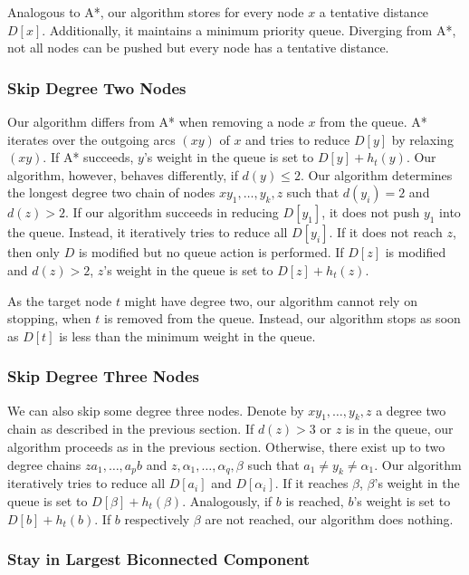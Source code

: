 \documentclass[manuscript,review]{acmart}
\begin{document}
Analogous to A*, our algorithm stores for every node $x$ a tentative distance $D[x]$.
Additionally, it maintains a minimum priority queue.
Diverging from A*, not all nodes can be pushed but every node has a tentative distance.

\subsubsection{Skip Degree Two Nodes}

Our algorithm differs from A* when removing a node $x$ from the queue.
A* iterates over the outgoing arcs $(xy)$ of $x$ and tries to reduce $D[y]$ by relaxing $(xy)$.
If A* succeeds, $y$'s weight in the queue is set to $D[y]+h_t(y)$.
Our algorithm, however, behaves differently, if $d(y)\le 2$.
Our algorithm determines the longest degree two chain of nodes $x y_1,\ldots, y_k, z$ such that $d(y_i)=2$ and $d(z) > 2$.
If our algorithm succeeds in reducing $D[y_1]$, it does not push $y_1$ into the queue.
Instead, it iteratively tries to reduce all $D[y_i]$.
If it does not reach $z$, then only $D$ is modified but no queue action is performed.
If $D[z]$ is modified and $d(z)>2$, $z$'s weight in the queue is set to $D[z]+h_t(z)$.

As the target node $t$ might have degree two, our algorithm cannot rely on stopping, when $t$ is removed from the queue.
Instead, our algorithm stops as soon as $D[t]$ is less than the minimum weight in the queue.

\subsubsection{Skip Degree Three Nodes}

We can also skip some degree three nodes.
Denote by $x y_1,\ldots, y_k, z$ a degree two chain as described in the previous section.
If $d(z) > 3$ or $z$ is in the queue, our algorithm proceeds as in the previous section.
Otherwise, there exist up to two degree chains $z a_1,\ldots,a_p b$ and $z,\alpha_1,\ldots,\alpha_q,\beta$ such that $a_1\neq y_k \neq \alpha_1$.
Our algorithm iteratively tries to reduce all $D[a_i]$ and $D[\alpha_i]$.
If it reaches $\beta$, $\beta$'s weight in the queue is set to $D[\beta]+h_t(\beta)$.
Analogously, if $b$ is reached, $b$'s weight is set to $D[b]+h_t(b)$.
If $b$ respectively $\beta$ are not reached, our algorithm does nothing.

\subsubsection{Stay in Largest Biconnected Component}\label{sec:largested-biconnected-component}
\end{document}
